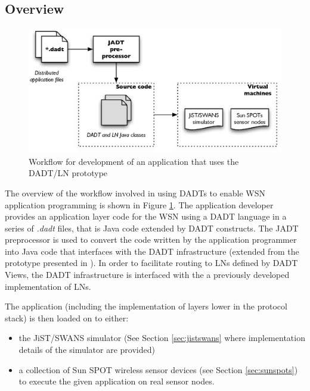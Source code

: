 \subsection{Overview}
\begin{figure}
\centering
\includegraphics[width=\textwidth]{img/DADTLN_workflow.eps} 
\caption[DADT/LN application workflow]{Workflow for development of an application that uses
the DADT/LN prototype}
\label{Fig:DADTLN_workflow}
\end{figure} 
The overview of the workflow involved in using DADTs to enable WSN application
programming is shown in Figure \ref{Fig:DADTLN_workflow}. The application
developer provides an application layer code for the WSN using a DADT
language in a series of \emph{.dadt} files, that is Java code extended by DADT
constructs. The JADT preprocessor is used to convert the code written by the
application programmer into Java code that interfaces with the DADT infrastructure (extended from the prototype presented in \cite{migliavacca_DADT:2006}). In order to facilitate routing to LNs defined by DADT Views, the DADT infrastructure is interfaced with the a
previously developed implementation of LNs. 

The application (including the implementation of layers lower in the protocol
stack) is then loaded on to either:
\begin{itemize}
\item the JiST/SWANS simulator \cite{barr_JIST:2005, barr_SWANS} (See Section
\ref{sec:jistswans} where implementation details of the simulator are provided) 
\item a collection of Sun SPOT wireless sensor devices
\cite{simon_squawk:2006} (see Section \ref{sec:sunspots}) to execute the given 
application on real sensor nodes.
\end{itemize}

